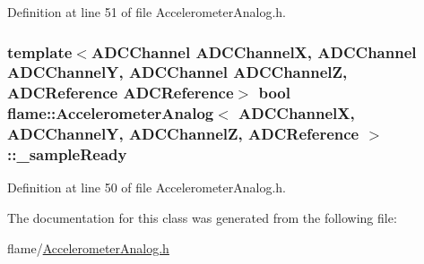 Definition at line 51 of file Accelerometer\-Analog.\-h.

\hypertarget{classflame_1_1_accelerometer_analog_a89b9682e1c2817adeb48ab91fc25c507}{
\subsubsection[{\-\_\-sample\-Ready}]{\setlength{\rightskip}{0pt plus 5cm}template$<$A\-D\-C\-Channel A\-D\-C\-Channel\-X, A\-D\-C\-Channel A\-D\-C\-Channel\-Y, A\-D\-C\-Channel A\-D\-C\-Channel\-Z, A\-D\-C\-Reference A\-D\-C\-Reference$>$ bool {\bf flame\-::\-Accelerometer\-Analog}$<$ A\-D\-C\-Channel\-X, A\-D\-C\-Channel\-Y, A\-D\-C\-Channel\-Z, {\bf A\-D\-C\-Reference} $>$\-::\-\_\-sample\-Ready\hspace{0.3cm}{\ttfamily [protected]}}}\label{classflame_1_1_accelerometer_analog_a89b9682e1c2817adeb48ab91fc25c507}


Definition at line 50 of file Accelerometer\-Analog.\-h.



The documentation for this class was generated from the following file\-:\begin{DoxyCompactItemize}
\item 
flame/\hyperlink{_accelerometer_analog_8h}{Accelerometer\-Analog.\-h}\end{DoxyCompactItemize}

